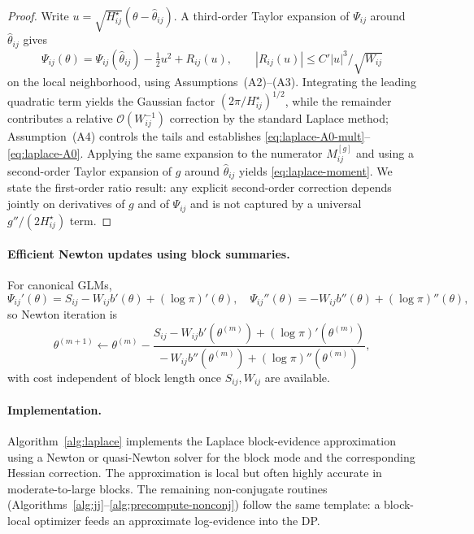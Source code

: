 \begin{proof}
Write $u=\sqrt{H_{ij}^{\star}}(\theta-\hat\theta_{ij})$. A third-order Taylor expansion of
$\Psi_{ij}$ around $\hat\theta_{ij}$ gives
\[
\Psi_{ij}(\theta)
= \Psi_{ij}(\hat\theta_{ij}) - \tfrac12 u^2 + R_{ij}(u),
\qquad |R_{ij}(u)| \le C' |u|^3 / \sqrt{W_{ij}}
\]
on the local neighborhood, using Assumptions~(A2)--(A3). Integrating the leading quadratic term yields the
Gaussian factor $(2\pi/H_{ij}^{\star})^{1/2}$, while the remainder contributes a relative
$\mathcal{O}(W_{ij}^{-1})$ correction by the standard Laplace method; Assumption~(A4) controls the tails and
establishes \eqref{eq:laplace-A0-mult}--\eqref{eq:laplace-A0}. Applying the same expansion to the numerator
$M^{[g]}_{ij}$ and using a second-order Taylor expansion of $g$ around $\hat\theta_{ij}$ yields
\eqref{eq:laplace-moment}. We state the first-order ratio result: any explicit second-order
correction depends jointly on derivatives of $g$ and of $\Psi_{ij}$ and is not captured by a universal
$g''/(2H_{ij}^{\star})$ term.
\end{proof}

\paragraph{Efficient Newton updates using block summaries.}
For canonical GLMs,
\[
\Psi_{ij}'(\theta) = S_{ij} - W_{ij} b'(\theta) + (\log\pi)'(\theta),\quad
\Psi_{ij}''(\theta) = -W_{ij} b''(\theta) + (\log\pi)''(\theta),
\]
so Newton iteration is
\[
\theta^{(m+1)} \leftarrow \theta^{(m)}
 - \frac{S_{ij} - W_{ij} b'(\theta^{(m)}) + (\log\pi)'(\theta^{(m)})}
        {-\,W_{ij} b''(\theta^{(m)}) + (\log\pi)''(\theta^{(m)})},
\]
with cost independent of block length once $S_{ij},W_{ij}$ are available.

\paragraph{Implementation.}
Algorithm~\ref{alg:laplace} implements the Laplace block-evidence approximation using a Newton
or quasi-Newton solver for the block mode and the corresponding Hessian correction. The
approximation is local but often highly accurate in moderate-to-large blocks. The remaining
non-conjugate routines (Algorithms~\ref{alg:jj}--\ref{alg:precompute-nonconj}) follow the same
template: a block-local optimizer feeds an approximate log-evidence into the DP.

